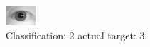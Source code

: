 \begin{figure}[h!]
\begin{center}
\includegraphics[width=0.60\columnwidth]{figures/ID1032_class_2_target_3.png}
\end{center}
\caption{ Classification: 2 actual target: 3}
\label{fig:ID1032_class_2_target_3}
\end{figure}
